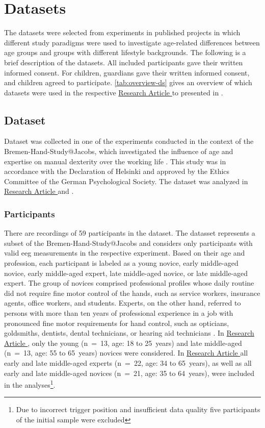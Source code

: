 \section{Datasets}
The datasets were selected from experiments in published projects in which different study paradigms were used to investigate age-related differences between age groups and groups with different lifestyle backgrounds. The following is a brief description of the datasets. All included participants gave their written informed consent. For children, guardians gave their written informed consent, and children agreed to participate. \autoref{tab:overview-ds} gives an overview of which datasets were used in the respective \hyperref[results:paperI]{Research Article } to \hyperref[results:paperIV]{} presented in .

\subsection{Dataset }
\label{methods:datasets:I}
Dataset  was collected in one of the experiments conducted in the context of the Bremen-Hand-Study@Jacobs, which investigated the influence of age and expertise on manual dexterity over the working life \cite{Voelcker-Rehage2013}. This study was in accordance with the Declaration of Helsinki and approved by the Ethics Committee of the German Psychological Society. The dataset was analyzed in \hyperref[results:paperI]{Research Article } and \hyperref[results:paperIV]{}. 

\subsubsection{Participants}
\label{methods:datasets:I:participants}
There are recordings of 59 participants in the dataset. The datasset represents a subset of the Bremen-Hand-Study@Jacobs and considers only participants with valid \gls{eeg} measurements in the respective experiment. Based on their age and profession, each participant is labeled as a young novice, early middle-aged novice, early middle-aged expert, late middle-aged novice, or late middle-aged expert. The group of novices comprised professional profiles whose daily routine did not require fine motor control of the hands, such as service workers, insurance agents, office workers, and students. Experts, on the other hand, referred to persons with more than ten years of professional experience in a job with pronounced fine motor requirements for hand control, such as opticians, goldsmiths, dentists, dental technicians, or hearing aid technicians \cite{Ericsson1991}. In \hyperref[results:paperI]{Research Article }, only the young (n~=~13, age: 18 to 25~years) and late middle-aged (n~=~13, age: 55 to 65~years) novices were considered. In \hyperref[results:paperIV]{Research Article } all early and late middle-aged experts (n~=~22, age: 34 to 65~years), as well as all early and late middle-aged novices (n~=~21, age: 35 to 64~years), were included in the analyses\footnote{Due to incorrect trigger position and insufficient data quality five participants of the initial sample were excluded}.

